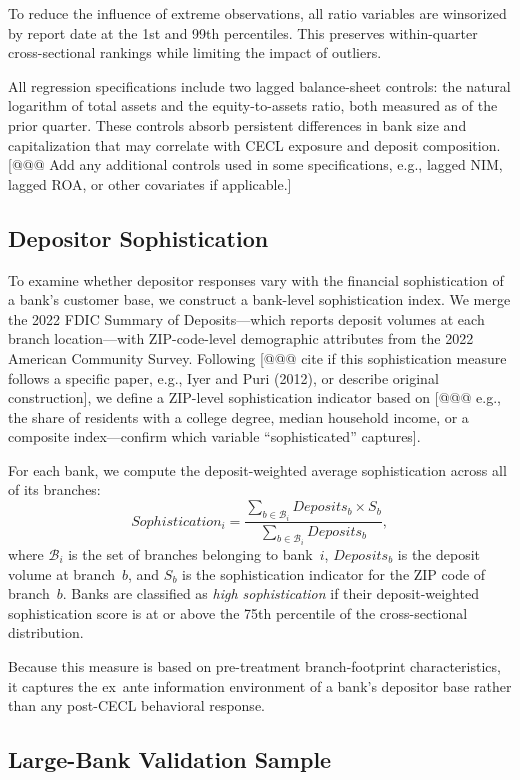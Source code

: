 To reduce the influence of extreme observations, all ratio variables are winsorized by report date at the 1st and 99th percentiles. This preserves within-quarter cross-sectional rankings while limiting the impact of outliers.

All regression specifications include two lagged balance-sheet controls: the natural logarithm of total assets and the equity-to-assets ratio, both measured as of the prior quarter. These controls absorb persistent differences in bank size and capitalization that may correlate with CECL exposure and deposit composition. [@@@ Add any additional controls used in some specifications, e.g., lagged NIM, lagged ROA, or other covariates if applicable.]

\subsection{Depositor Sophistication}

To examine whether depositor responses vary with the financial sophistication of a bank's customer base, we construct a bank-level sophistication index. We merge the 2022 FDIC Summary of Deposits---which reports deposit volumes at each branch location---with ZIP-code-level demographic attributes from the 2022 American Community Survey. Following [@@@ cite if this sophistication measure follows a specific paper, e.g., Iyer and Puri (2012), or describe original construction], we define a ZIP-level sophistication indicator based on [@@@ e.g., the share of residents with a college degree, median household income, or a composite index---confirm which variable ``sophisticated'' captures].

For each bank, we compute the deposit-weighted average sophistication across all of its branches:
\[
Sophistication_i = \frac{\sum_{b \in \mathcal{B}_i} Deposits_b \times S_b}{\sum_{b \in \mathcal{B}_i} Deposits_b},
\]
where $\mathcal{B}_i$ is the set of branches belonging to bank~$i$, $Deposits_b$ is the deposit volume at branch~$b$, and $S_b$ is the sophistication indicator for the ZIP code of branch~$b$. Banks are classified as \emph{high sophistication} if their deposit-weighted sophistication score is at or above the 75th percentile of the cross-sectional distribution.

Because this measure is based on pre-treatment branch-footprint characteristics, it captures the ex~ante information environment of a bank's depositor base rather than any post-CECL behavioral response.

\subsection{Large-Bank Validation Sample}

